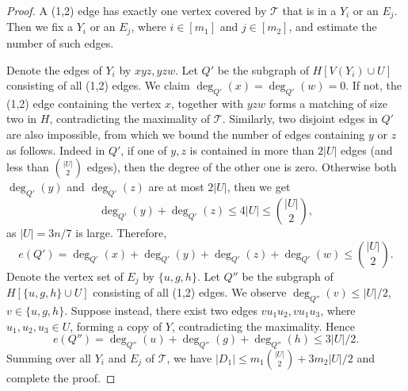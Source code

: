 \documentclass[11pt, reqno]{amsart}    	%
\theoremstyle{definition}
\def\cT{\mathcal T}
\numberwithin{equation}{section}
\begin{document}
	\begin{proof}
		A (1,2) edge has exactly one vertex covered by $\cT$ that is in a $Y_{i}$ or an $E_{j}$. Then we fix a $Y_{i}$ or an $E_{j}$, where $i\in [m_1]$ and $j\in [m_2]$, and estimate the number of such edges.
		
		Denote the edges  of $Y_{i}$ by  $xyz,yzw$. Let $ Q' $ be the subgraph of $H[V(Y_i)\cup U]$ consisting of all (1,2) edges. We claim $\deg_{Q'}(x)=\deg_{Q'}(w)=0$. If not, the (1,2) edge containing the vertex $x$, together with $yzw$ forms a matching of size two in $H$, contradicting the maximality of $\cT$. Similarly, two disjoint edges in $Q'$ are also impossible, from which we bound the number of edges containing $ y $ or $ z $ as follows. 
		Indeed in $ Q' $, if one of $y,z$ is contained in more than $2|U|$ edges (and less than $\binom{|U|}{2}$ edges), then the degree of the other one is zero. Otherwise both  $ \deg_{Q'}(y)$ and $\deg_{Q'}(z) $ are at most $2|U|$, then we get 
		\[
		\deg_{Q'}(y)+\deg_{Q'}(z)\le 4|U| \le \binom{|U|}{2},
		\]
		as $|U|=3n/7$ is large. 
		Therefore, 
		\[
		e(Q')=\deg_{Q'}(x)+\deg_{Q'}(y)+\deg_{Q'}(z)+\deg_{Q'}(w)\le \binom{|U|}{2}.
		\]
		Denote the vertex set of $E_{j}$ by $\{u,g,h\}$. Let $ Q'' $ be the subgraph of $H[\{u,g,h\}\cup U]$ consisting of all (1,2) edges. We observe $\deg_{Q''}(v)\le |U|/2$, $v\in \{u,g,h\}$. Suppose instead, there exist two edges  $vu_{1}u_{2},vu_{1}u_{3}$, where $ u_{1},u_{2},u_{3}\in U $, forming a copy of $Y$, contradicting the maximality. Hence \[e(Q'')=\deg_{Q''}(u)+\deg_{Q''}(g)+\deg_{Q''}(h)\le 3|U|/2.\]
		Summing over all $  Y_i$ and  $E_{j}$ of $\cT$, we have $|D_{1}| \le m_1 \binom{|U|}{2}+3m_2|U|/2$
		and complete the proof.
	\end{proof}
	
\end{document}
